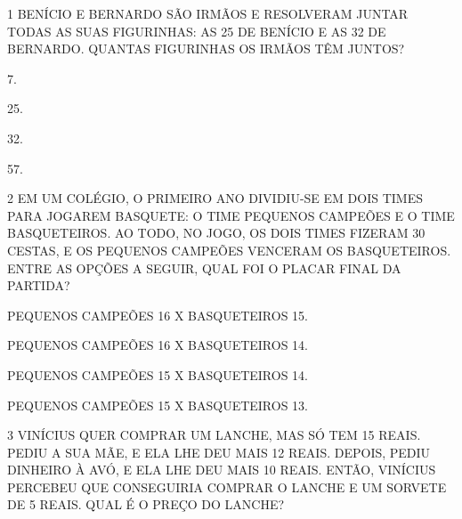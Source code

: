 
\num{1} BENÍCIO E BERNARDO SÃO IRMÃOS E RESOLVERAM JUNTAR TODAS AS
SUAS FIGURINHAS: AS 25 DE BENÍCIO E AS 32 DE BERNARDO. QUANTAS FIGURINHAS OS
IRMÃOS TÊM JUNTOS?

\begin{escolha}
\item
  7.
\item
  25.
\item
  32.
\item
  57.
\end{escolha}


\num{2} EM UM COLÉGIO, O PRIMEIRO ANO DIVIDIU-SE EM DOIS TIMES PARA JOGAREM BASQUETE: O TIME PEQUENOS CAMPEÕES E O TIME BASQUETEIROS. AO TODO, NO JOGO, OS DOIS TIMES FIZERAM 30 CESTAS, E OS PEQUENOS CAMPEÕES VENCERAM OS BASQUETEIROS. ENTRE AS OPÇÕES A SEGUIR, QUAL FOI O PLACAR FINAL DA PARTIDA?

\begin{escolha}
\item
  PEQUENOS CAMPEÕES 16 X BASQUETEIROS 15.
\item
  PEQUENOS CAMPEÕES 16 X BASQUETEIROS 14.
\item
  PEQUENOS CAMPEÕES 15 X BASQUETEIROS 14.
\item
  PEQUENOS CAMPEÕES 15 X BASQUETEIROS 13.
\end{escolha}



\num{3} VINÍCIUS QUER COMPRAR UM LANCHE, MAS SÓ TEM 15 REAIS. PEDIU A SUA MÃE, E
ELA LHE DEU MAIS 12 REAIS. DEPOIS, PEDIU DINHEIRO À AVÓ, E ELA
LHE DEU MAIS 10 REAIS. ENTÃO, VINÍCIUS PERCEBEU QUE CONSEGUIRIA COMPRAR O LANCHE E UM SORVETE DE 5 REAIS. QUAL É O PREÇO DO LANCHE?

